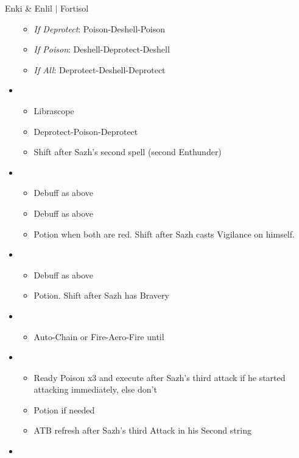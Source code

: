 \begin{battle}[1:41 $|$ 1:30]{Enki \& Enlil $|$ Fortisol}
\begin{multicols}{2}
\begin{itemize}
			      \begin{itemize}
				      \item \textit{If Deprotect}: Poison-Deshell-Poison
				      \item \textit{If Poison}: Deshell-Deprotect-Deshell
				      \item \textit{If All}: Deprotect-Deshell-Deprotect
			      \end{itemize}
			\item \second
			      \begin{itemize}
				      \item Librascope
				      \item Deprotect-Poison-Deprotect
				      \item Shift after Sazh's second spell (second Enthunder)
			      \end{itemize}
			\item \third
			      \begin{itemize}
				      \item Debuff as above
				      \item Debuff as above
				      \item Potion when both are red. Shift after Sazh casts Vigilance on himself.
			      \end{itemize}
			\item \second
			      \begin{itemize}
				      \item Debuff as above
				      \item Potion. Shift after Sazh has Bravery
			      \end{itemize}
			\item \fourth
			      \begin{itemize}
				      \item Auto-Chain or Fire-Aero-Fire until \stagger
			      \end{itemize}
			\item \sixth
			      \begin{itemize}
				      \item Ready Poison x3 and execute after Sazh's third attack if he started attacking immediately, else don't
				      \item Potion if needed
				      \item ATB refresh after Sazh's third Attack in his Second string
			      \end{itemize}
			\item \first
			      \begin{itemize}

\end{itemize}
\end{itemize}
\end{multicols}
\end{battle}
